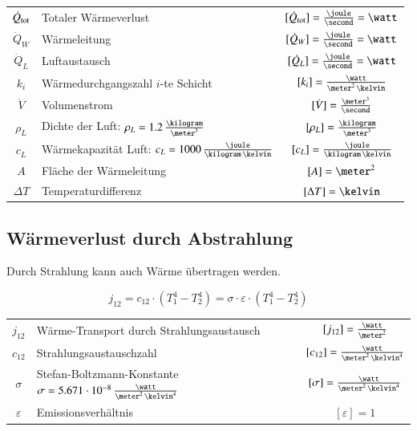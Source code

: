 \renewcommand{\arraystretch}{1.3}
\begin{tabular}{c l c}
	$\dot{Q}_{\rm tot}$	& Totaler Wärmeverlust														& $[\dot{Q}_{\rm tot}] = \frac{\joule}{\second} = \watt$	\\
	$\dot{Q}_W$ 		& Wärmeleitung 																& $[\dot{Q}_W] = \frac{\joule}{\second} = \watt$			\\
	$\dot{Q}_L$ 		& Luftaustausch 															& $[\dot{Q}_L] = \frac{\joule}{\second} = \watt$			\\
	$k_i$ 				& Wärmedurchgangszahl $i$-te Schicht 										& $[k_i] = \frac{\watt}{\meter^2 \, \kelvin}$ 				\\
	$\dot{V}$ 			& Volumenstrom 																& $[\dot{V}] = \frac{\meter^3}{\second}$ 					\\
	$\rho_L$ 			& Dichte der Luft: $\rho_L = 1.2 \, \frac{\kilogram}{\meter^3}$				& $[\rho_L] = \frac{\kilogram}{\meter^3}$ 					\\
	$c_L$ 				& Wärmekapazität Luft: $c_L = 1000 \, \frac{\joule}{\kilogram \, \kelvin}$ 	& $[c_L] = \frac{\joule}{\kilogram \, \kelvin}$ 			\\
	$A$ 				& Fläche der Wärmeleitung 													& $[A] = \meter^2$ 											\\
	$\Delta T$ 			& Temperaturdifferenz 														& $[\Delta T] = \kelvin$
\end{tabular}
\renewcommand{\arraystretch}{1}


\subsection{Wärmeverlust durch Abstrahlung}

Durch Strahlung kann auch Wärme übertragen werden.

$$ \boxed{ j_{12} = c_{12} \cdot (T_1^4 - T_2^4) = \sigma \cdot \varepsilon \cdot (T_1^4 - T_2^4) }   $$

\renewcommand{\arraystretch}{1.3}
\begin{tabular}{c l c}
	$j_{12}$ 		& Wärme-Transport durch Strahlungsaustausch 														& $[j_{12}] = \frac{\watt}{\meter^2}$ 				\\
	$c_{12}$ 		& Strahlungsaustauschzahl 																			& $[c_{12}] = \frac{\watt}{\meter^2 \, \kelvin^4}$ 	\\
	$\sigma$ 		& Stefan-Boltzmann-Konstante $\sigma = 5.671 \cdot 10^{-8} \, \frac{\watt}{\meter^2 \, \kelvin^4}$	& $[\sigma] = \frac{\watt}{\meter^2 \, \kelvin^4}$	\\
	$\varepsilon$ 	& Emissionsverhältnis 																				& $[\varepsilon] = 1$
\end{tabular}
\renewcommand{\arraystretch}{1}

